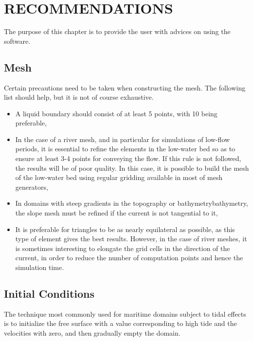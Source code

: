 \chapter{  RECOMMENDATIONS}
\label{ch:reccom}
 The purpose of this chapter is to provide the user with advices on using the software.
\section{ Mesh}

 Certain precautions need to be taken when constructing the mesh. The following list should help, but it is not of course exhaustive.

\begin{itemize}
\item  A liquid boundary should consist of at least 5 points, with 10 being preferable,

\item  In the case of a river mesh, and in particular for simulations of low-flow periods, it is essential to refine the elements in the low-water bed so as to ensure at least 3-4 points for conveying the flow. If this rule is not followed, the results will be of poor quality. In this case, it is possible to build the mesh of the low-water bed using regular gridding available in most of mesh generators,

\item  In domains with steep gradients in the topography or bathymetrybathymetry, the slope mesh must be refined if the current is not tangential to it,

\item  It is preferable for triangles to be as nearly equilateral as possible, as this type of element gives the best results. However, in the case of river meshes, it is sometimes interesting to elongate the grid cells in the direction of the current, in order to reduce the number of computation points and hence the simulation time.
\end{itemize}


\section{ Initial Conditions}

 The technique most commonly used for maritime domains subject to tidal effects is to initialize the free surface with a value corresponding to high tide and the velocities with zero, and then gradually empty the domain.

